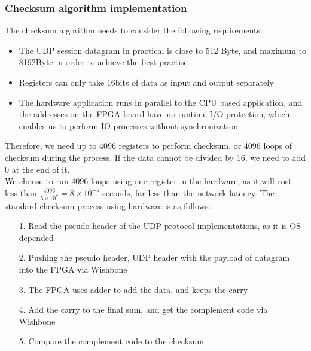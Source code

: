 \documentclass[11pt,openright,a4paper]{report}
\begin{document}
\subsubsection{Checksum algorithm implementation}
The checksum algorithm needs to consider the following requirements:
\begin{itemize}
	\item The UDP session datagram in practical is close to 512 Byte\cite{deering1998internet}, and maximum to 8192Byte in order to achieve the best practise
	\item Registers can only take 16bits of data as input and output separately
	\item The hardware application runs in parallel to the CPU based application, and the addresses on the FPGA board have no runtime I/O protection, which enables us to perform IO processes without synchronization
\end{itemize}
Therefore, we need up to 4096 registers to perform checksum, or 4096 loops of checksum during the process. If the data cannot be divided by 16, we need to add $0$ at the end of it.\\
We choose to run 4096 loops using one register in the hardware, as it will cost less than $\frac{4096}{5 \times 10^{7} }= 8 \times 10^{-5}$ seconds, far less than the network latency.
The standard checksum process using hardware is as follows:
\begin{itemize}
	\item[1.] Read the pseudo header of the UDP protocol implementations, as it is OS depended
	\item[2.] Pushing the pseudo header, UDP header with the payload of datagram into the FPGA via Wishbone
	\item[3.] The FPGA uses adder to add the data, and keeps the carry
	\item[4.] Add the carry to the final sum, and get the complement code via Wishbone
	\item[5.] Compare the complement code to the checksum
\end{itemize}
\end{document}
